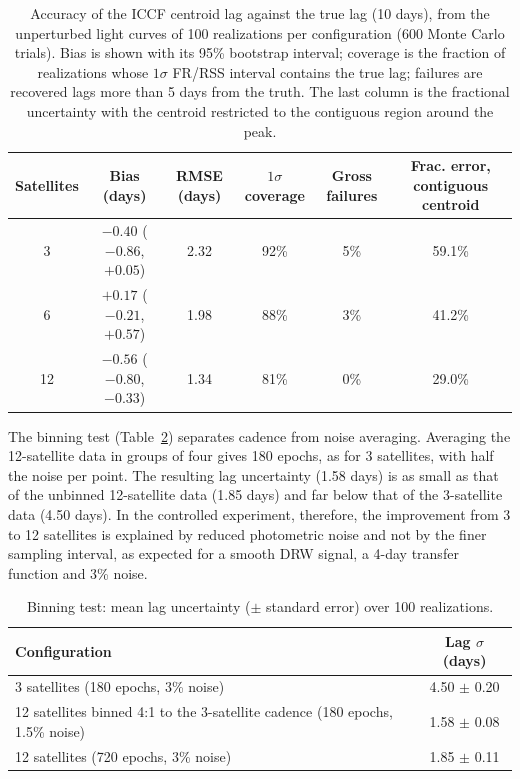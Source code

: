 \documentclass[11pt]{article}
\begin{document}
\begin{table}[htbp]
\centering
\small
\caption{Accuracy of the ICCF centroid lag against the true lag (10 days), from the unperturbed light curves of 100 realizations per configuration (600 Monte Carlo trials). Bias is shown with its 95\% bootstrap interval; coverage is the fraction of realizations whose $1\sigma$ FR/RSS interval contains the true lag; failures are recovered lags more than 5 days from the truth. The last column is the fractional uncertainty with the centroid restricted to the contiguous region around the peak.}
\label{tab:diagnostics}
\begin{tabular}{@{}cccccc@{}}
\toprule
Satellites & Bias (days) & RMSE (days) & $1\sigma$ coverage & Gross failures & Frac. error, contiguous centroid \\
\midrule
3 & $-0.40$ ($-0.86$, $+0.05$) & 2.32 & 92\% & 5\% & 59.1\% \\
6 & $+0.17$ ($-0.21$, $+0.57$) & 1.98 & 88\% & 3\% & 41.2\% \\
12 & $-0.56$ ($-0.80$, $-0.33$) & 1.34 & 81\% & 0\% & 29.0\% \\
\bottomrule
\end{tabular}
\end{table}

The binning test (Table~\ref{tab:binning}) separates cadence from noise averaging. Averaging the 12-satellite data in groups of four gives 180 epochs, as for 3 satellites, with half the noise per point. The resulting lag uncertainty (1.58 days) is as small as that of the unbinned 12-satellite data (1.85 days) and far below that of the 3-satellite data (4.50 days). In the controlled experiment, therefore, the improvement from 3 to 12 satellites is explained by reduced photometric noise and not by the finer sampling interval, as expected for a smooth DRW signal, a 4-day transfer function and 3\% noise.

\begin{table}[htbp]
\centering
\small
\caption{Binning test: mean lag uncertainty ($\pm$ standard error) over 100 realizations.}
\label{tab:binning}
\begin{tabular}{@{}lc@{}}
\toprule
Configuration & Lag $\sigma$ (days) \\
\midrule
3 satellites (180 epochs, 3\% noise) & 4.50 $\pm$ 0.20 \\
12 satellites binned 4:1 to the 3-satellite cadence (180 epochs, 1.5\% noise) & 1.58 $\pm$ 0.08 \\
12 satellites (720 epochs, 3\% noise) & 1.85 $\pm$ 0.11 \\
\bottomrule
\end{tabular}
\end{table}
\end{document}
